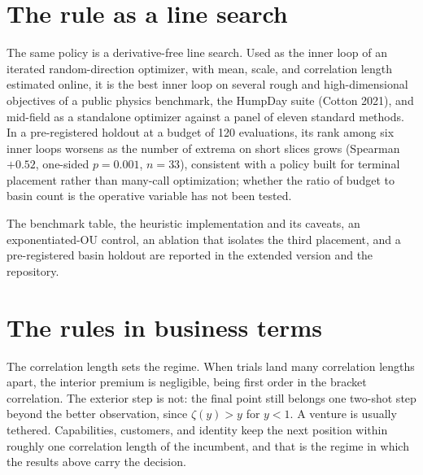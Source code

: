\documentclass[11pt]{article}
\theoremstyle{itheads}
\begin{document}
\section{The rule as a line search}\label{sec:linesearch}

The same policy is a derivative-free line search. Used as the inner
loop of an iterated random-direction optimizer, with mean, scale, and
correlation length estimated online, it is the best inner loop on
several rough and high-dimensional objectives of a public physics
benchmark, the HumpDay suite (Cotton 2021), and mid-field as a
standalone optimizer against a panel of eleven standard methods. In a
pre-registered holdout at a budget of 120 evaluations, its rank among
six inner loops worsens as the number of extrema on short slices
grows (Spearman $+0.52$, one-sided $p=0.001$, $n=33$), consistent
with a policy built for terminal placement rather than many-call
optimization; whether the ratio of budget to basin count is the
operative variable has not been tested.

The benchmark table, the heuristic implementation and its caveats, an
exponentiated-OU control, an ablation that isolates the third
placement, and a pre-registered basin holdout are reported in the
extended version and the repository.

\section{The rules in business terms}

The correlation length sets the regime. When trials land many
correlation lengths apart, the interior premium is negligible, being
first order in the bracket correlation. The exterior step is not: the
final point still belongs one two-shot step beyond the better
observation, since $\zeta(y)>y$ for $y<1$. A venture is usually
tethered. Capabilities, customers, and identity keep the next
position within roughly one correlation length of the incumbent, and
that is the regime in which the results above carry the decision.
\end{document}
